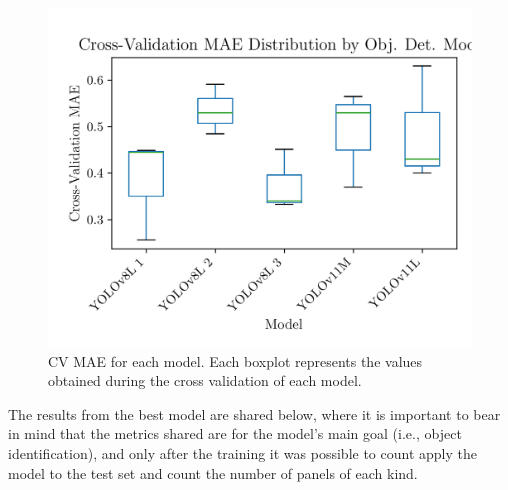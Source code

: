 \documentclass[conference]{IEEEtran}
\begin{document}
\begin{figure}[H]
    \centering
    \includegraphics[width=1\linewidth]{assets/model03_mae_boxplot.png}
    \caption{CV MAE for each model. Each boxplot represents the values obtained during the cross validation of each model.}
    \label{fig:model03_mae_boxplot}
\end{figure}

The results from the best model are shared below, where it is important to bear in mind that the metrics shared are for the model's main goal (i.e., object identification), and only after the training it was possible to count apply the model to the test set and count the number of panels of each kind.

\end{document}
